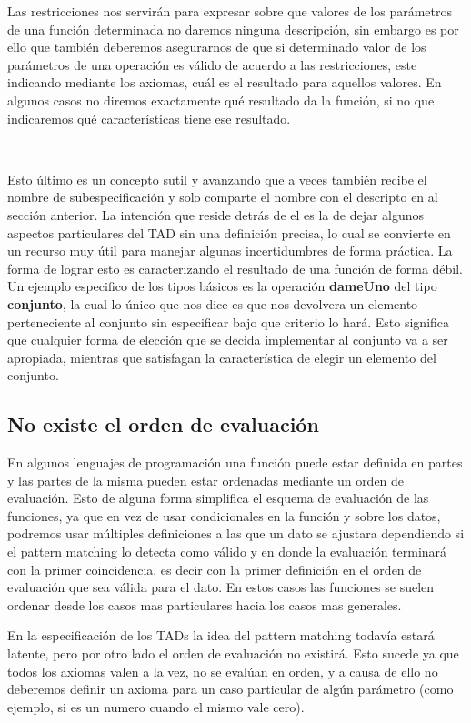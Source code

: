 \documentclass[10pt, a4paper]{report}
\begin{document}
Las restricciones nos servir\'an para expresar sobre que valores de los par\'ametros de una funci\'on determinada no daremos ninguna descripci\'on, sin embargo es por ello que tambi\'en deberemos asegurarnos de que si determinado valor de los par\'ametros de una operaci\'on es v\'alido de acuerdo a las restricciones, este indicando mediante los axiomas, cu\'al es el resultado para aquellos valores. En algunos casos no diremos exactamente qu\'e resultado da la funci\'on, si no que indicaremos qu\'e caracter\'isticas tiene ese resultado.

~

Esto \'ultimo es un concepto sutil y avanzando que a veces tambi\'en recibe el nombre de subespecificaci\'on y solo comparte el nombre con el descripto en al secci\'on anterior. La intenci\'on que reside detr\'as de el es la de dejar algunos aspectos particulares del TAD sin una definici\'on precisa, lo cual se convierte en un recurso muy \'util para manejar algunas incertidumbres de forma pr\'actica. La forma de lograr esto es caracterizando el resultado de una funci\'on de forma d\'ebil. Un ejemplo especifico de los tipos b\'asicos es la operaci\'on \textbf{dameUno} del tipo \textbf{conjunto}, la cual lo \'unico que nos dice es que nos devolvera un elemento perteneciente al conjunto sin especificar bajo que criterio lo har\'a. Esto significa que cualquier forma de elecci\'on que se decida implementar al conjunto va a ser apropiada, mientras que satisfagan la caracter\'istica de elegir un elemento del conjunto.

\subsection{No existe el orden de evaluaci\'on}
En algunos lenguajes de programaci\'on una funci\'on puede estar definida en partes y las partes de la misma pueden estar ordenadas mediante un orden de evaluaci\'on. Esto de alguna forma simplifica el esquema de evaluaci\'on de las funciones, ya que en vez de usar condicionales en la funci\'on y sobre los datos, podremos usar m\'ultiples definiciones a las que un dato se ajustara dependiendo si el pattern matching lo detecta como v\'alido y en donde la evaluaci\'on terminar\'a con la primer coincidencia, es decir con la primer definici\'on en el orden de evaluaci\'on que sea v\'alida para el dato. En estos casos las funciones se suelen ordenar desde los casos mas particulares hacia los casos mas generales.

En la especificaci\'on de los TADs la idea del pattern matching todav\'ia estar\'a latente, pero por otro lado el orden de evaluaci\'on no existir\'a. Esto sucede ya que todos los axiomas valen a la vez, no se eval\'uan en orden, y a causa de ello no deberemos definir un axioma para un caso particular de alg\'un par\'ametro (como ejemplo, si es un numero cuando el mismo vale cero).
\end{document}

